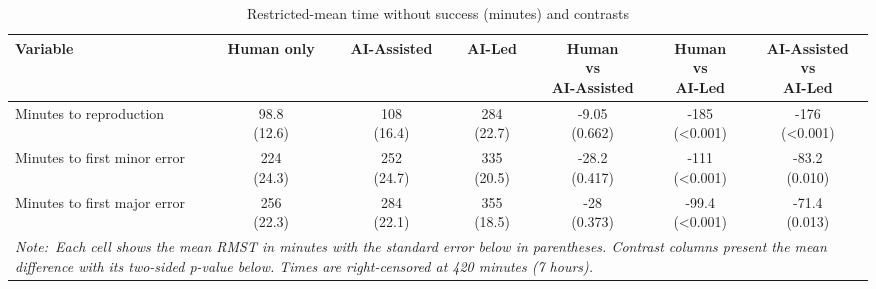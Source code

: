 \begin{table}[ht]
\small
\centering
\caption{Restricted-mean time without success (minutes) and contrasts} 
\label{tab:rmst}
\begin{tabular}{lcccccc}
  \hline\hline
Variable & Human only & AI-Assisted & AI-Led & \shortstack{Human\\vs\\AI-Assisted} & \shortstack{Human\\vs\\AI-Led} & \shortstack{AI-Assisted\\vs\\AI-Led} \\ 
  \hline\hline
Minutes to reproduction & \shortstack{98.8\\(12.6)} & \shortstack{ 108\\(16.4)} & \shortstack{ 284\\(22.7)} & \shortstack{-9.05\\(0.662)} & \shortstack{-185\\(<0.001)} & \shortstack{-176\\(<0.001)} \\ 
  Minutes to first minor error & \shortstack{ 224\\(24.3)} & \shortstack{ 252\\(24.7)} & \shortstack{ 335\\(20.5)} & \shortstack{-28.2\\(0.417)} & \shortstack{-111\\(<0.001)} & \shortstack{-83.2\\(0.010)} \\ 
  Minutes to first major error & \shortstack{ 256\\(22.3)} & \shortstack{ 284\\(22.1)} & \shortstack{ 355\\(18.5)} & \shortstack{ -28\\(0.373)} & \shortstack{-99.4\\(<0.001)} & \shortstack{-71.4\\(0.013)} \\ 
   \hline\hline
\multicolumn{7}{p{\textwidth}}{\it Note:~Each cell shows the mean RMST in minutes with the standard error below in parentheses. Contrast columns present the mean difference with its two-sided \emph{p}-value below. Times are right-censored at 420 minutes (7 hours).}
\end{tabular}
\end{table}
